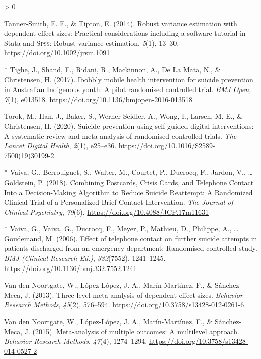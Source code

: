 \documentclass[
  english,
  man]{apa6}
\newlength{\cslhangindent}
\newenvironment{CSLReferences}[2] %
 {%
  \setlength{\parindent}{0pt}
  \ifodd #1 \everypar{\setlength{\hangindent}{\cslhangindent}}\ignorespaces\fi
  \ifnum #2 > 0
  \setlength{\parskip}{#2\baselineskip}
  \fi
 }%
 {}
\begin{document}
\begin{CSLReferences}{1}{0}
\leavevmode\hypertarget{ref-tanner-smith2014}{}%
Tanner-Smith, E. E., \& Tipton, E. (2014). Robust variance estimation with dependent effect sizes: Practical considerations including a software tutorial in {Stata} and {\textsc{Spss}}: Robust variance estimation, \emph{5}(1), 13--30. \url{https://doi.org/10.1002/jrsm.1091}

\leavevmode\hypertarget{ref-tighe2017}{}%
* Tighe, J., Shand, F., Ridani, R., Mackinnon, A., De La Mata, N., \& Christensen, H. (2017). Ibobbly mobile health intervention for suicide prevention in {Australian Indigenous} youth: A pilot randomised controlled trial. \emph{BMJ Open}, \emph{7}(1), e013518. \url{https://doi.org/10.1136/bmjopen-2016-013518}

\leavevmode\hypertarget{ref-torok2020}{}%
Torok, M., Han, J., Baker, S., Werner-Seidler, A., Wong, I., Larsen, M. E., \& Christensen, H. (2020). Suicide prevention using self-guided digital interventions: A systematic review and meta-analysis of randomised controlled trials. \emph{The Lancet Digital Health}, \emph{2}(1), e25--e36. \url{https://doi.org/10.1016/S2589-7500(19)30199-2}

\leavevmode\hypertarget{ref-vaiva2018}{}%
* Vaiva, G., Berrouiguet, S., Walter, M., Courtet, P., Ducrocq, F., Jardon, V., \ldots{} Goldstein, P. (2018). Combining {Postcards}, {Crisis Cards}, and {Telephone Contact Into} a {Decision}-{Making Algorithm} to {Reduce Suicide Reattempt}: A {Randomized Clinical Trial} of a {Personalized Brief Contact Intervention}. \emph{The Journal of Clinical Psychiatry}, \emph{79}(6). \url{https://doi.org/10.4088/JCP.17m11631}

\leavevmode\hypertarget{ref-vaiva2006}{}%
* Vaiva, G., Vaiva, G., Ducrocq, F., Meyer, P., Mathieu, D., Philippe, A., \ldots{} Goudemand, M. (2006). Effect of telephone contact on further suicide attempts in patients discharged from an emergency department: Randomised controlled study. \emph{BMJ (Clinical Research Ed.)}, \emph{332}(7552), 1241--1245. \url{https://doi.org/10.1136/bmj.332.7552.1241}

\leavevmode\hypertarget{ref-vandennoortgate2013}{}%
Van den Noortgate, W., López-López, J. A., Marín-Martínez, F., \& Sánchez-Meca, J. (2013). Three-level meta-analysis of dependent effect sizes. \emph{Behavior Research Methods}, \emph{45}(2), 576--594. \url{https://doi.org/10.3758/s13428-012-0261-6}

\leavevmode\hypertarget{ref-vandennoortgate2015}{}%
Van den Noortgate, W., López-López, J. A., Marín-Martínez, F., \& Sánchez-Meca, J. (2015). Meta-analysis of multiple outcomes: A multilevel approach. \emph{Behavior Research Methods}, \emph{47}(4), 1274--1294. \url{https://doi.org/10.3758/s13428-014-0527-2}


\end{CSLReferences}
\end{document}
